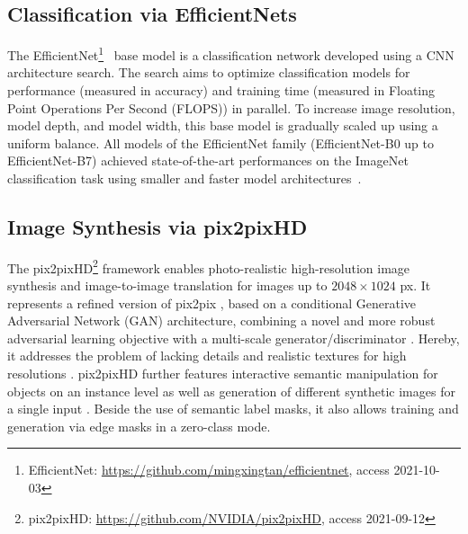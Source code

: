 \documentclass[runningheads]{llncs}
\begin{document}
\subsection{Classification via EfficientNets} %

The EfficientNet\footnote{EfficientNet: \url{https://github.com/mingxingtan/efficientnet}, access 2021-10-03}~\cite{EfficientNet} base model is a classification network developed using a CNN architecture search. The search aims to optimize classification models for performance (measured in accuracy) and training time (measured in Floating Point Operations Per Second (FLOPS)) in parallel.
To increase image resolution, model depth, and model width, this base model is gradually scaled up using a uniform balance. All models of the EfficientNet family (EfficientNet-B0 up to EfficientNet-B7) achieved state-of-the-art performances on the ImageNet \cite{Deng2009} classification task using smaller and faster model architectures~\cite{EfficientNet}. 


\subsection{Image Synthesis via pix2pixHD} %

The pix2pixHD\footnote{pix2pixHD: \url{https://github.com/NVIDIA/pix2pixHD}, access 2021-09-12} \cite{wang2018} framework enables photo-realistic high-resolution image synthesis and image-to-image translation for images up to $2048 \times 1024$ px. It represents a refined version of pix2pix \cite{isola2017}, based on a conditional \cite{mirza2014cgans} Generative Adversarial Network (GAN) \cite{goodfellow2014gans} architecture, combining a novel and more robust adversarial learning objective with a multi-scale generator/discriminator \cite{wang2018}. Hereby, it addresses the problem of lacking details and realistic textures for high resolutions \cite{isola2017,wang2018}. pix2pixHD further features interactive semantic manipulation for objects on an instance level as well as generation of different synthetic images for a single input \cite{wang2018}. Beside the use of semantic label masks, it also allows training and generation via edge masks in a zero-class mode.



\end{document}

